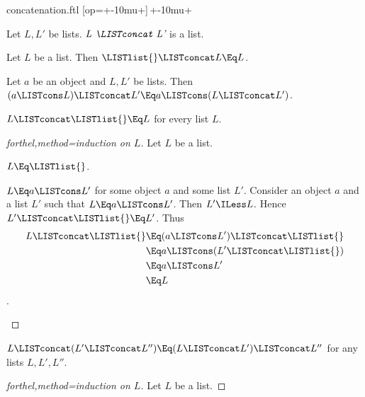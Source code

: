 \documentclass[lang=en,debug=all]{stex}
\begin{document}
\begin{smodule}{concatenation.ftl}
[op=+\mkern-10mu+]{\,\comp+\mkern-10mu\comp+\,}

\begin{signature}[forthel,for=LISTconcat]
  Let $L, L'$ be lists.
  $\emph{L \LISTconcat L'}$ is a list.
\end{signature}

\begin{axiom}[forthel,for=LISTconcat]
  Let $L$ be a list.
  Then $\LISTlist{} \LISTconcat L \Eq L$.
\end{axiom}

\begin{axiom}[forthel,for=LISTconcat]
  Let $a$ be an object and $L, L'$ be lists.
  Then $(a \LISTcons L) \LISTconcat L' \Eq a \LISTcons (L \LISTconcat L')$.
\end{axiom}

\begin{proposition}[forthel]
  $L \LISTconcat \LISTlist{} \Eq L$ for every list $L$.
\end{proposition}
\begin{proof}[forthel,method=induction on $L$]
  Let $L$ be a list.

  \begin{case}{$L \Eq \LISTlist{}$.} \end{case}
  
  \begin{case}{$L \Eq a \LISTcons L'$ for some object $a$ and some list $L'$.}
    Consider an object $a$ and a list $L'$ such that $L \Eq a \LISTcons L'$.
    Then $L' \ILess L$.
    Hence $L' \LISTconcat \LISTlist{} \Eq L'$.
    Thus
    \begin{align*}
      L \LISTconcat \LISTlist{}
        &\Eq (a \LISTcons L') \LISTconcat \LISTlist{}\\
        &\Eq a \LISTcons (L' \LISTconcat \LISTlist{})\\
        &\Eq a \LISTcons L'\\
        &\Eq L
    \end{align*}.
  \end{case}
\end{proof}


\begin{proposition}[forthel,name=associativity of concatenation]
  $L \LISTconcat (L' \LISTconcat L'') \Eq (L \LISTconcat L') \LISTconcat L''$ for any lists $L, L', L''$.
\end{proposition}
\begin{proof}[forthel,method=induction on $L$]
  Let $L$ be a list.


\end{proof}
\end{smodule}
\end{document}
